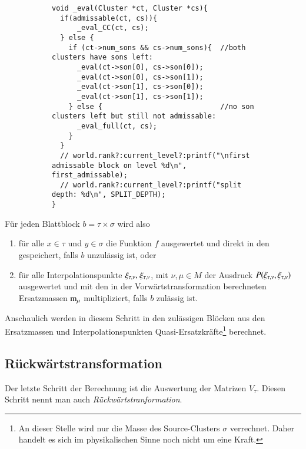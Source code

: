     \begin{figure}[tb]
    \begin{subfigure}{0.9\textwidth}
    \begin{lstlisting}[label=lst:eval, caption={Durch diese rekursive Struktur wird ein impliziter Blockbaum durchlaufen, um die Matrizen $S_b$ bzw. $N_b$ auszuwerten.}]
void _eval(Cluster *ct, Cluster *cs){
  if(admissable(ct, cs)){
      _eval_CC(ct, cs);
  } else {
    if (ct->num_sons && cs->num_sons){	//both clusters have sons left:
      _eval(ct->son[0], cs->son[0]);
      _eval(ct->son[0], cs->son[1]);
      _eval(ct->son[1], cs->son[0]);
      _eval(ct->son[1], cs->son[1]);
    } else {                          	//no son clusters left but still not admissable:
      _eval_full(ct, cs);
    }
  }
  // world.rank?:current_level?:printf("\nfirst admissable block on level %d\n", first_admissable);
  // world.rank?:current_level?:printf("split depth: %d\n", SPLIT_DEPTH);
}
    \end{lstlisting}
    \end{subfigure}
    \end{figure}
    
    Für jeden Blattblock $b = \tau \times \sigma$ wird also
    \begin{enumerate}
     \item für alle $x \in \tau$ und $y \in \sigma$ die Funktion $f$ ausgewertet und direkt in den  gespeichert, falls $b$ unzulässig ist, oder
     \item für alle Interpolationspunkte $\xi_{\tau, \nu} \text{, } \xi_{\tau, \nu}$, mit $\nu,\mu \in M$ der Ausdruck $P(\xi_{\tau, \nu} , \xi_{\tau, \nu})$ ausgewertet und mit den in der 
     Vorwärtstransformation berechneten Ersatzmassen $\tcode{m}_\mu$ multipliziert, falls $b$ zulässig ist.
    \end{enumerate}
    
    Anschaulich werden in diesem Schritt in den zulässigen Blöcken aus den Ersatzmassen und Interpolationspunkten Quasi-Ersatzkräfte\footnote{An dieser Stelle wird nur die 
    Masse des Source-Clusters $\sigma$ verrechnet. Daher handelt es sich im physikalischen Sinne noch nicht um eine Kraft.} berechnet. 

    \subsection{Rückwärtstransformation}
    Der letzte Schritt der Berechnung ist die Auswertung der Matrizen $V_\tau$. Diesen Schritt nennt man auch \textit{Rückwärtstranformation}.
    

